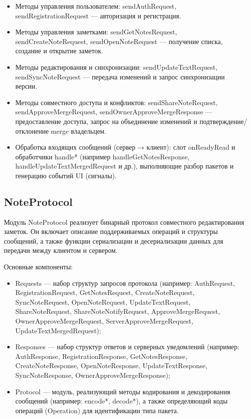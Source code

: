 \begin{itemize}
    \item Методы управления пользователем: sendAuthRequest, sendRegistrationRequest — авторизация и регистрация.
    \item Методы управления заметками: sendGetNotesRequest, sendCreateNoteRequest, sendOpenNoteRequest — получение списка, создание и открытие заметок.
    \item Методы редактирования и синхронизации: sendUpdateTextRequest, sendSyncNoteRequest — передача изменений и запрос синхронизации версии.
    \item Методы совместного доступа и конфликтов: sendShareNoteRequest, sendApproveMergeRequest, sendOwnerApproveMergeResponse — предоставление доступа, запрос на объединение изменений и подтверждение/отклонение merge владельцем.
    \item Обработка входящих сообщений (сервер → клиент): слот onReadyRead и обработчики handle* (например handleGetNotesResponse, handleUpdateTextMergedRequest и др.), выполняющие разбор пакетов и генерацию событий UI (сигналы).
\end{itemize}


\subsection*{NoteProtocol}

Модуль NoteProtocol реализует бинарный протокол совместного редактирования заметок. Он включает описание поддерживаемых операций и структуры сообщений, а также функции сериализации и десериализации данных для передачи между клиентом и сервером.

Основные компоненты:

\begin{itemize}
    \item Requests — набор структур запросов протокола (например: AuthRequest, RegistrationRequest, GetNotesRequest, CreateNoteRequest, SyncNoteRequest, OpenNoteRequest, UpdateTextRequest, ShareNoteRequest, ShareNoteNotifyRequest, ApproveMergeRequest, OwnerApproveMergeRequest, ServerApproveMergeRequest, UpdateTextMergedRequest);
    \item Responses — набор структур ответов и серверных уведомлений (например: AuthResponse, RegistrationResponse, GetNotesResponse, CreateNoteResponse, OpenNoteResponse, UpdateTextResponse, SyncNoteResponse, OwnerApproveMergeResponse);
    \item Protocol — модуль, реализующий методы кодирования и декодирования сообщений (например: encode*, decode*), а также определяющий коды операций (Operation) для идентификации типа пакета.
\end{itemize}



